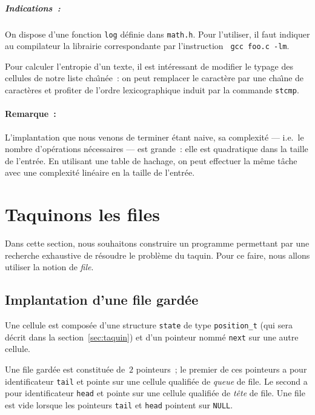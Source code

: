 \begin{exercice}
  \ifcorrection%
  \begin{correction}
  \end{correction}
  \fi%
  
  \subparagraph{Indications~:}%
  On  dispose d'une fonction  \verb+log+ d\'efinie dans \verb+math.h+. 
  Pour l'utiliser, il   faut  indiquer  au compilateur   la   librairie
  correspondante par l'instruction \verb+ gcc foo.c -lm+.
  \par
  Pour  calculer  l'entropie  d'un   texte,  il est  int\'eressant  de
  modifier le typage  des cellules de  notre liste cha\^\i{}n\'ee~: on
  peut remplacer le caract\`ere par une cha\^\i{}ne de caract\`eres et
  profiter   de    l'ordre lexicographique   induit   par la  commande
  \verb+stcmp+.
  
  \paragraph{Remarque~:}
  L'implantation que   nous  venons  de terminer   \'etant   naive, sa
  complexit\'e --- i.e.\ le nombre d'op\'erations n\'ecessaires --- est
  grande~: elle  est  quadratique dans la  taille de   l'entr\'ee.  En
  utilisant une table de hachage, on peut  effectuer la m\^eme t\^ache
  avec une complexit\'e lin\'eaire en la taille de l'entr\'ee.
\end{exercice}
\section{Taquinons les files}
\label{sec:TaquinFile}
Dans cette section, nous souhaitons construire un programme permettant
par une recherche exhaustive de r\'esoudre le probl\`eme du taquin.
Pour ce faire, nous allons utiliser la notion de \textit{file}.
\subsection{Implantation d'une file gard\'ee}
\label{sec:file}
Une cellule est compos\'ee d'une structure \texttt{state} de type
\texttt{position\_t} (qui sera d\'ecrit dans la
section~\ref{sec:taquin}) et d'un pointeur nomm\'e \texttt{next} sur
une autre cellule.
\par
Une file gard\'ee est constitu\'ee de~$2$ pointeurs~; le premier de
ces pointeurs a pour identificateur \texttt{tail} et pointe sur une
cellule qualifi\'ee de \textit{queue} de file. Le second a pour
identificateur \texttt{head} et pointe sur une cellule qualifi\'ee de
\textit{t\^ete} de file. Une file est vide lorsque les pointeurs
\texttt{tail} et \texttt{head} pointent sur \texttt{NULL}.
